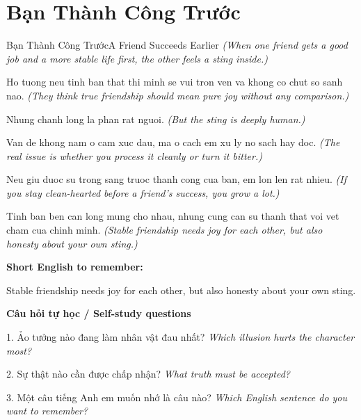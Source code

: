 \section{Bạn Thành Công Trước}
\begin{truyen}{Bạn Thành Công Trước}{A Friend Succeeds Earlier}
\textit{(When one friend gets a good job and a more stable life first, the other feels a sting inside.)}

Ho tuong neu tinh ban that thi minh se vui tron ven va khong co chut so sanh nao.
\textit{(They think true friendship should mean pure joy without any comparison.)}

Nhung chanh long la phan rat nguoi.
\textit{(But the sting is deeply human.)}

Van de khong nam o cam xuc dau, ma o cach em xu ly no sach hay doc.
\textit{(The real issue is whether you process it cleanly or turn it bitter.)}

Neu giu duoc su trong sang truoc thanh cong cua ban, em lon len rat nhieu.
\textit{(If you stay clean-hearted before a friend’s success, you grow a lot.)}

\end{truyen}

\begin{baihoc}
Tinh ban ben can long mung cho nhau, nhung cung can su thanh that voi vet cham cua chinh minh.
\textit{(Stable friendship needs joy for each other, but also honesty about your own sting.)}
\end{baihoc}

\begin{ghinhoanh}
\textbf{Short English to remember:}

Stable friendship needs joy for each other, but also honesty about your own sting.

\end{ghinhoanh}

\begin{tuhocnhanh}
\textbf{Câu hỏi tự học / Self-study questions}

1. Ảo tưởng nào đang làm nhân vật đau nhất? \textit{Which illusion hurts the character most?}

2. Sự thật nào cần được chấp nhận? \textit{What truth must be accepted?}

3. Một câu tiếng Anh em muốn nhớ là câu nào? \textit{Which English sentence do you want to remember?}
\end{tuhocnhanh}
\ngancach

